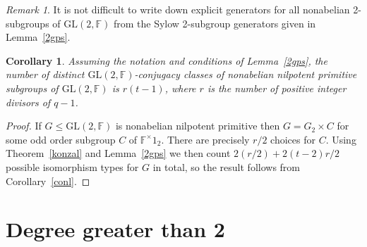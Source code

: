 \documentclass[12pt]{amsart}
\newtheorem{corollary}[theorem]{Corollary}
\theoremstyle{definition}
\theoremstyle{remark}
\newtheorem*{remark}{Remark}
\begin{document}
\begin{remark}
 It is not difficult to write down explicit generators for 
 all nonabelian 2-subgroups of $\mathrm{GL}(2,\mathbb{F})$
 from the Sylow 2-subgroup generators given in 
 Lemma~\ref{2gps}. 
\end{remark}
\begin{corollary}
\label{cclcount}
 Assuming the notation and conditions of 
 Lemma{\rm~\ref{2gps}}, the number of distinct 
 $\mathrm{GL}(2,\mathbb{F})$-conjugacy 
 classes of nonabelian nilpotent primitive  subgroups of 
 $\mathrm{GL}(2,\mathbb{F})$ is
 $r(t-1)$, where $r$ is the number of 
 positive integer divisors of $q-1$.
\end{corollary}
\begin{proof}
 If $G \leq \mathrm{GL}(2,\mathbb{F})$ is 
 nonabelian nilpotent primitive then $G=G_2 \times C$ 
 for some odd order subgroup $C$ of $\mathbb{F}^{\times}1_2$.
 There are precisely $r/2$ choices for $C$. Using 
 Theorem~\ref{konzal} and Lemma~\ref{2gps} we then count
 $2(r/2)+2(t-2)r/2$ possible isomorphism types for $G$
 in total, so the result follows from 
 Corollary~\ref{conl}.  
\end{proof}

\section{Degree greater than 2}
\label{greater2}
 
\end{document}
